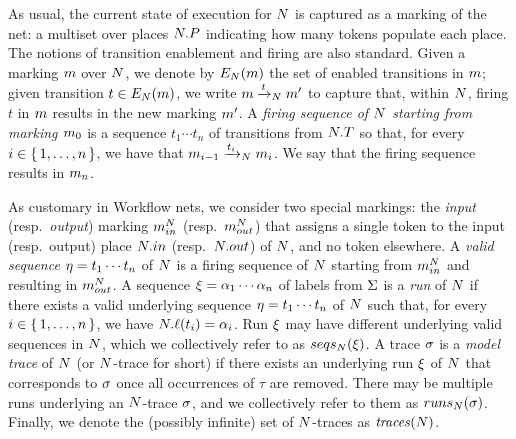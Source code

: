 As usual, the current state of execution for $N$ is captured as a marking of the net: a multiset over places $N.P$ indicating how many tokens populate each place.
The notions of transition enablement and firing are also standard. Given a marking $m$ over \uswn $N$, we denote by $E_{N}(m)$ the set of enabled transitions in $m$; given transition $t \in E_{N}(m)$, we write $m\xrightarrow{t}_{N}m'$ to capture that, within $N$, firing $t$ in $m$ results in the new marking $m'$. A \emph{firing sequence of $N$ starting from marking $m_0$} is a sequence $t_1\cdots t_n$ of transitions from $N.T$ so that, for every $i \in \set{1,\ldots,n}$, we have that $m_{i-1}\xrightarrow{t_i}_{N}m_{i}$. We say that the firing sequence results in $m_{n}$.

As customary in Workflow nets, we consider two special markings: the \emph{input} (resp.~\emph{output}) marking $m_{in}^{N}$ (resp.~$m_{out}^{N}$) that assigns a single token to the input (resp.~output) place $N.in$ (resp.~$N.out$) of $N$, and no token elsewhere. A \emph{valid sequence} $\eta = t_1\cdots t_n$ of $N$ is a firing sequence of $N$ starting from $m_{in}^{N}$ and resulting in $m_{out}^{N}$. A sequence $\xi = \alpha_1 \cdots \alpha_n$ of labels from $\Sigma$ is a \emph{run} of $N$ if there exists a valid underlying sequence $\eta = t_1\cdots t_n$ of $N$  such that, for every $i \in \set{1,\ldots,n}$, we have $N.\ell(t_i) = \alpha_i$. Run $\xi$ may have different underlying valid sequences in $N$, which we collectively refer to as $seqs_{N}(\xi)$. A trace ${\sigma}$ is a \emph{model trace} of $N$ (or $N$-trace for short) if there exists an underlying run $\xi$ of $N$ that corresponds to ${\sigma}$ once all occurrences of $\tau$ are removed. There may be multiple runs underlying an $N$-trace ${\sigma}$, and we collectively refer to them as $runs_{N}({\sigma})$. Finally, we denote the (possibly infinite) set of $N$-traces as $\mathit{traces}(N)$.

